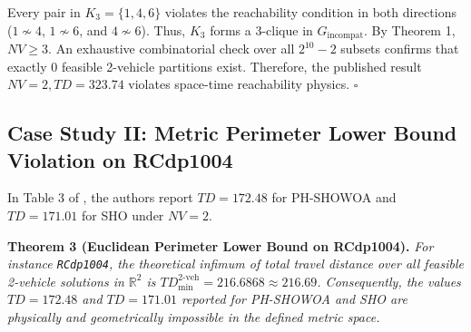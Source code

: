 Every pair in $K_3 = \{1, 4, 6\}$ violates the reachability condition in both directions ($1 \nsim 4$, $1 \nsim 6$, and $4 \nsim 6$). Thus, $K_3$ forms a 3-clique in $G_{\text{incompat}}$. By Theorem 1, $NV \ge 3$. An exhaustive combinatorial check over all $2^{10}-2$ subsets confirms that exactly $0$ feasible 2-vehicle partitions exist. Therefore, the published result $NV = 2, TD = 323.74$ violates space-time reachability physics. \hfill $\square$

\subsection{Case Study II: Metric Perimeter Lower Bound Violation on RCdp1004}
\label{sec:rcdp1004}
In Table 3 of \cite{nguyen2026phshowoa}, the authors report $TD = 172.48$ for PH-SHOWOA and $TD = 171.01$ for SHO under $NV = 2$.

\vspace{0.25cm}
\noindent\textbf{Theorem 3 (Euclidean Perimeter Lower Bound on RCdp1004).}
\textit{For instance \texttt{RCdp1004}, the theoretical infimum of total travel distance over all feasible 2-vehicle solutions in $\mathbb{R}^2$ is $TD_{\min}^{2\text{-veh}} = 216.6868 \approx 216.69$. Consequently, the values $TD = 172.48$ and $TD = 171.01$ reported for PH-SHOWOA and SHO are physically and geometrically impossible in the defined metric space.}

